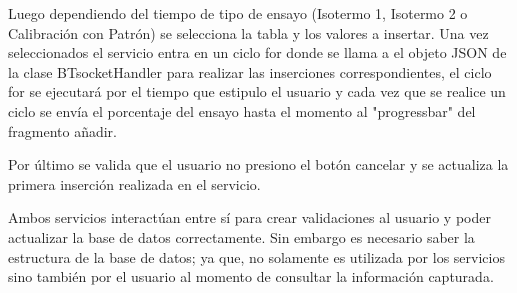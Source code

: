 \par \noindent
Luego dependiendo del tiempo de tipo de ensayo (Isotermo 1, Isotermo 2 o Calibración con Patrón) se selecciona la tabla y los valores a insertar. Una vez seleccionados el servicio entra en un ciclo for donde se llama a el objeto JSON de la clase BTsocketHandler para realizar las inserciones correspondientes, el ciclo for se ejecutará por el tiempo que estipulo el usuario y cada vez que se realice un ciclo se envía el porcentaje del ensayo hasta el momento al "progressbar" del fragmento añadir.

\par \noindent
Por último se valida que el usuario no presiono el botón cancelar y se actualiza la primera inserción realizada en el servicio.

\par \noindent
Ambos servicios interactúan entre sí para crear validaciones al usuario y poder actualizar la base de datos correctamente. Sin embargo es necesario saber la estructura de la base de datos; ya que, no solamente es utilizada por los servicios sino también por el usuario al momento de consultar la información capturada. 

\clearpage

